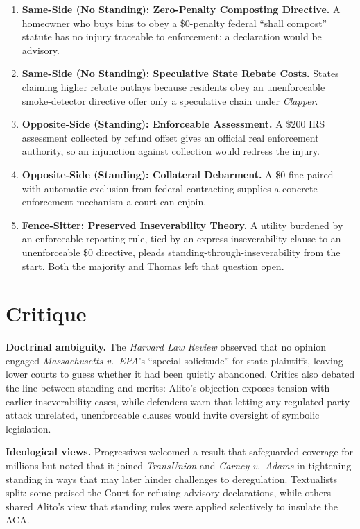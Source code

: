 \documentclass[12pt]{article}
\begin{document}
\begin{enumerate}
\item \textbf{Same-Side (No Standing): Zero-Penalty Composting Directive.} A homeowner who buys bins to obey a \$0-penalty federal ``shall compost'' statute has no injury traceable to enforcement; a declaration would be advisory.
\item \textbf{Same-Side (No Standing): Speculative State Rebate Costs.} States claiming higher rebate outlays because residents obey an unenforceable smoke-detector directive offer only a speculative chain under \textit{Clapper}.
\item \textbf{Opposite-Side (Standing): Enforceable Assessment.} A \$200 IRS assessment collected by refund offset gives an official real enforcement authority, so an injunction against collection would redress the injury.
\item \textbf{Opposite-Side (Standing): Collateral Debarment.} A \$0 fine paired with automatic exclusion from federal contracting supplies a concrete enforcement mechanism a court can enjoin.
\item \textbf{Fence-Sitter: Preserved Inseverability Theory.} A utility burdened by an enforceable reporting rule, tied by an express inseverability clause to an unenforceable \$0 directive, pleads standing-through-inseverability from the start. Both the majority and Thomas left that question open.
\end{enumerate}

\section{Critique}

\textbf{Doctrinal ambiguity.} The \textit{Harvard Law Review} observed that no opinion engaged \textit{Massachusetts v.\ EPA}'s ``special solicitude'' for state plaintiffs, leaving lower courts to guess whether it had been quietly abandoned. Critics also debated the line between standing and merits: Alito's objection exposes tension with earlier inseverability cases, while defenders warn that letting any regulated party attack unrelated, unenforceable clauses would invite oversight of symbolic legislation.

\textbf{Ideological views.} Progressives welcomed a result that safeguarded coverage for millions but noted that it joined \textit{TransUnion} and \textit{Carney v.\ Adams} in tightening standing in ways that may later hinder challenges to deregulation. Textualists split: some praised the Court for refusing advisory declarations, while others shared Alito's view that standing rules were applied selectively to insulate the ACA.
\end{document}

